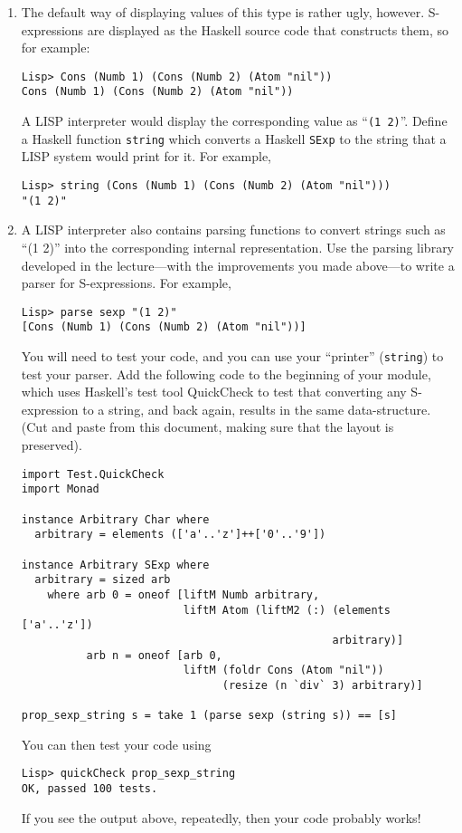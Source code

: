 \documentclass{article}
\begin{document}
\begin{enumerate}
\item
The default way of displaying values of this type is rather ugly,
however. S-expressions are displayed as the Haskell source code that
constructs them, so for example:
\begin{verbatim}
Lisp> Cons (Numb 1) (Cons (Numb 2) (Atom "nil"))
Cons (Numb 1) (Cons (Numb 2) (Atom "nil"))
\end{verbatim}
A LISP interpreter would display the corresponding value as
``\verb!(1 2)!''. Define a Haskell function \verb!string! which
converts a Haskell \verb!SExp! to the string that a LISP system would
print for it. For example,
\begin{verbatim}
Lisp> string (Cons (Numb 1) (Cons (Numb 2) (Atom "nil")))
"(1 2)"
\end{verbatim}
\item
A LISP interpreter also contains parsing functions to convert strings
such as ``(1 2)'' into the corresponding internal representation. Use
the parsing library developed in the lecture---with the improvements
you made above---to write a parser for S-expressions. For example,
\begin{verbatim}
Lisp> parse sexp "(1 2)"
[Cons (Numb 1) (Cons (Numb 2) (Atom "nil"))]
\end{verbatim}

You will need to test your code, and you can use your ``printer''
(\verb!string!) to test your parser. Add the following code to the
beginning of your module, which uses Haskell's test tool QuickCheck to
test that converting any S-expression to a string, and back again,
results in the same data-structure. (Cut and paste from this
document, making sure that the layout is preserved).
\begin{verbatim}
import Test.QuickCheck
import Monad

instance Arbitrary Char where
  arbitrary = elements (['a'..'z']++['0'..'9'])

instance Arbitrary SExp where
  arbitrary = sized arb
    where arb 0 = oneof [liftM Numb arbitrary, 
                         liftM Atom (liftM2 (:) (elements ['a'..'z'])
                                                arbitrary)]
          arb n = oneof [arb 0, 
                         liftM (foldr Cons (Atom "nil")) 
                               (resize (n `div` 3) arbitrary)]

prop_sexp_string s = take 1 (parse sexp (string s)) == [s]
\end{verbatim}
You can then test your code using
\begin{verbatim}
Lisp> quickCheck prop_sexp_string
OK, passed 100 tests.
\end{verbatim}
If you see the output above, repeatedly, then your code probably works!
\end{enumerate}
\end{document}
